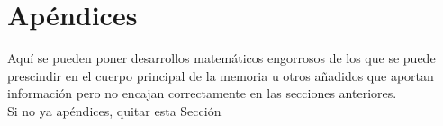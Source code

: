 \documentclass[11pt,a4paper,spanish]{book}
\begin{document}
% 
%

% 



\cleardoublepage
{} 

\makeatletter
\def\@biblabel#1{}
\makeatother

 








\appendix
\chapter{Apéndices}

Aquí se pueden poner desarrollos matemáticos engorrosos de los que se puede prescindir en el cuerpo principal de la memoria u otros añadidos que aportan información pero no encajan correctamente en las secciones anteriores.\\

Si no ya apéndices, quitar esta Sección
\end{document}
